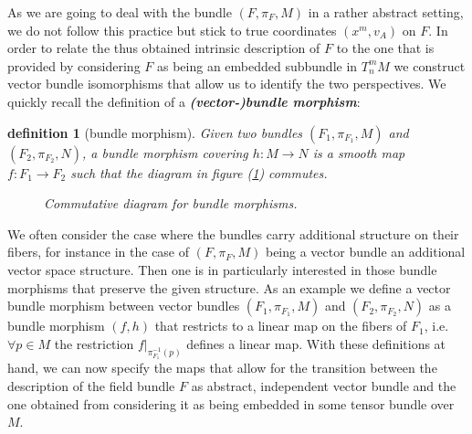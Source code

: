 \documentclass[a4paper,12pt, DIV=14, BCOR=5mm, twoside, headsepline, numbers=noenddot]{scrbook}
\newtheorem{definition}{definition}[section]
\newtheorem*{remark}{Remark}
\begin{document}
As we are going to deal with the bundle $(F, \pi_F, M)$ in a rather abstract setting, we do not follow this practice but stick to true coordinates $(x^m,v_A)$ on $F$. 
In order to relate the thus obtained intrinsic description of $F$ to the one that is provided by considering $F$ as being an embedded subbundle in $T^m_n M$ we construct vector bundle isomorphisms that allow us to identify the two perspectives. We quickly recall the definition of a \textit{\textbf{(vector-)bundle morphism}}:
\begin{definition}[bundle morphism]
Given two bundles $(F_1, \pi_{F_1}, M)$ and $(F_2, \pi_{F_2}, N)$, a bundle morphism covering $h : M \rightarrow N$ is a smooth map $f : F_1 \rightarrow F_2$ such that the diagram in figure (\ref{BundleMorph}) commutes.
\begin{figure}[hbt!]
\centering 
{}
\caption{Commutative diagram for bundle morphisms.}\label{BundleMorph}
\end{figure}
\end{definition}

We often consider the case where the bundles carry additional structure on their fibers, for instance in the case of $(F, \pi_F, M)$ being a vector bundle an additional vector space structure. Then one is in particularly interested in those bundle morphisms that preserve the given structure. As an example we define a vector bundle morphism between vector bundles $(F_1, \pi_{F_1}, M)$ and $(F_2, \pi_{F_2}, N)$ as a bundle morphism $(f,h)$ that restricts to a linear map on the fibers of $F_1$, i.e. $\forall p \in M$ the restriction $f \vert_{\pi_{F_1}^{-1}(p)}$ defines a linear map.
With these definitions at hand, we can now specify the maps that allow for the transition between the description of the field bundle $F$ as abstract, independent vector bundle and the one obtained from considering it as being embedded in some tensor bundle over $M$.
\end{document}
